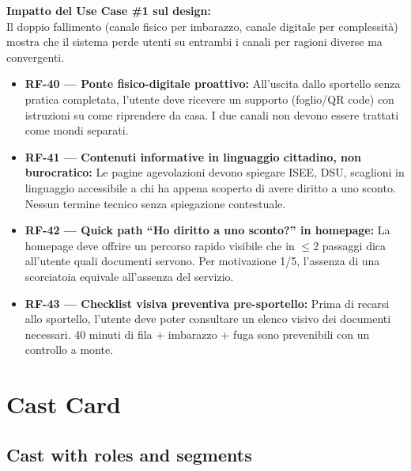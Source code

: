 ﻿\documentclass[11pt,a4paper]{article}
\begin{document}
\vspace{0.3cm}

\begin{tcolorbox}[base]
    {\small
    \textbf{Impatto del Use Case \#1 sul design:} \\[4pt]
    Il doppio fallimento (canale fisico per imbarazzo, canale digitale per complessità) mostra che il sistema perde utenti su entrambi i canali per ragioni diverse ma convergenti.

    \begin{itemize}[leftmargin=*]
        \item \textbf{RF-40 --- Ponte fisico-digitale proattivo:} All'uscita dallo sportello senza pratica completata, l'utente deve ricevere un supporto (foglio/QR code) con istruzioni su come riprendere da casa. I due canali non devono essere trattati come mondi separati.

        \item \textbf{RF-41 --- Contenuti informative in linguaggio cittadino, non burocratico:} Le pagine agevolazioni devono spiegare ISEE, DSU, scaglioni in linguaggio accessibile a chi ha appena scoperto di avere diritto a uno sconto. Nessun termine tecnico senza spiegazione contestuale.

        \item \textbf{RF-42 --- Quick path ``Ho diritto a uno sconto?'' in homepage:} La homepage deve offrire un percorso rapido visibile che in $\leq$2 passaggi dica all'utente quali documenti servono. Per motivazione 1/5, l'assenza di una scorciatoia equivale all'assenza del servizio.

        \item \textbf{RF-43 --- Checklist visiva preventiva pre-sportello:} Prima di recarsi allo sportello, l'utente deve poter consultare un elenco visivo dei documenti necessari. 40 minuti di fila + imbarazzo + fuga sono prevenibili con un controllo a monte.
    \end{itemize}
    }
\end{tcolorbox}


\newpage
\section{Cast Card}

\subsection{Cast with roles and segments}
\end{document}
